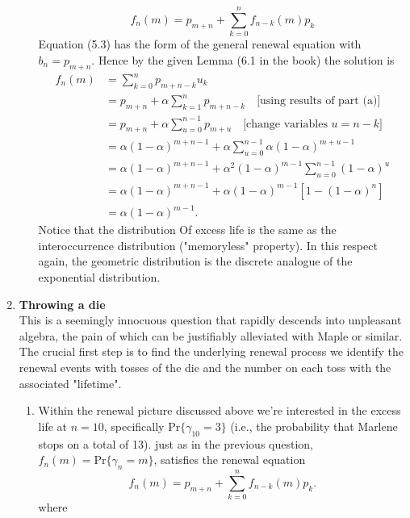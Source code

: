 \documentclass[11pt,a4paper]{article}
\begin{document}
\begin{enumerate}
\begin{enumerate}
\begin{equation}
        f_n(m) = p_{m + n} + \sum_{k = 0}^{n}f_{n - k}(m)p_k
      \end{equation}
      Equation (5.3) has the form of the general renewal equation with $b_n = p_{m + n}$. Hence by the given Lemma (6.1 in the book) the solution is
      \begin{align*}
        f_n(m)
        &= \sum_{k = 0}^n p_{m + n - k}u_k\\
        &= p_{m + n} + \alpha\sum_{k = 1}^n p_{m + n - k}\quad \text{[using results of part (a)]}\\
        &= p_{m + n} + \alpha\sum_{u = 0}^{n - 1}p_{m + u}\quad \text{[change variables $u = n - k$]}\\
        &= \alpha(1 - \alpha)^{m + n -1} + \alpha\sum_{u = 0}^{n - 1}\alpha(1 - \alpha)^{m + u - 1}\\
        &= \alpha(1 - \alpha)^{m + n -1} + \alpha^2(1 - \alpha)^{m - 1}\sum_{u = 0}^{n - 1}(1 - \alpha)^u\\
        &= \alpha(1 - \alpha)^{m + n - 1} + \alpha(1 - \alpha)^{m - 1}[1 - (1 - \alpha)^n]\\
        &= \alpha(1 - \alpha)^{m - 1}.
      \end{align*}
      Notice that the distribution Of excess life is the same as the interoccurrence distribution ("memoryless" property). In this respect again, the geometric distribution is the discrete analogue of the exponential distribution.
    \end{enumerate}
    \item \textbf{Throwing a die}\\
    This is a seemingly innocuous question that rapidly descends into unpleasant algebra, the pain of which can be justifiably alleviated with Maple or similar. The crucial first step is to find the underlying renewal process we identify the renewal events with tosses of the die and the number on each toss with the associated "lifetime".
    \begin{enumerate}
      \item Within the renewal picture discussed above we're interested in the excess life at $n = 10$, specifically $\text{Pr}\{\gamma_{10} = 3\}$ (i.e., the probability that Marlene stops on a total of 13). just as in the previous question, $f_n(m) = \text{Pr}\{\gamma_n = m\}$, satisfies the renewal equation
      \begin{equation}\tag{5.4}
        f_n(m) = p_{m + n} + \sum_{k = 0}^n f_{n - k}(m)p_k.
      \end{equation}
      where

\end{enumerate}
\end{enumerate}
\end{document}
